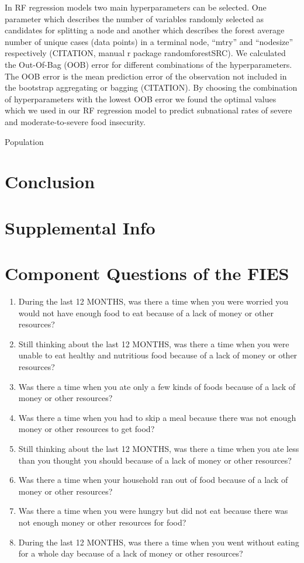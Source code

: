 \documentclass{article}
\begin{document}
In RF regression models two main hyperparameters can be selected. One parameter which describes the number of variables randomly selected as candidates for splitting a node and another which describes the forest average number of unique cases (data points) in a terminal node, “mtry” and “nodesize” respectively (CITATION, manual r package randomforestSRC). We calculated the Out-Of-Bag (OOB) error for different combinations of the hyperparameters. The OOB error is the mean prediction error of the observation not included in the bootstrap aggregating or bagging (CITATION). By choosing the combination of hyperparameters with the lowest OOB error we found the optimal values which we used in our RF regression model to predict subnational rates of severe and moderate-to-severe food insecurity.

Population \citep{Smits2019, KC2017}

\section{Conclusion}

\printbibliography

\section*{Supplemental Info}
\setcounter{table}{0}
\setcounter{figure}{0}
\setcounter{section}{0}
\renewcommand{\thetable}{S\arabic{table}}
\renewcommand{\thefigure}{S\arabic{figure}}
\renewcommand{\thesection}{S\arabic{section}}

\section{Component Questions of the FIES}
\begin{enumerate}
	\item During the last 12 MONTHS, was there a time when you were worried you would not have enough food to eat because of a lack of money or other resources?
	\item Still thinking about the last 12 MONTHS, was there a time when you were unable to eat healthy and nutritious food because of a lack of money or other resources?
	\item Was there a time when you ate only a few kinds of foods because of a lack of money or other resources?
	\item Was there a time when you had to skip a meal because there was not enough money or other resources to get food?
	\item Still thinking about the last 12 MONTHS, was there a time when you ate less than you thought you should because of a lack of money or other resources?
	\item Was there a time when your household ran out of food because of a lack of money or other resources?
	\item Was there a time when you were hungry but did not eat because there was not enough money or other resources for food?
	\item During the last 12 MONTHS, was there a time when you went without eating for a whole day because of a lack of money or other resources?
\end{enumerate}
\end{document}
